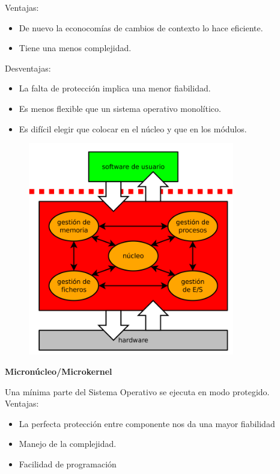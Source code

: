 \documentclass{article}
\begin{document}
Ventajas:
\begin{itemize}
\item De nuevo la econocomías de cambios de contexto lo hace eficiente.

\item Tiene una menos complejidad.
\end{itemize}

Desventajas:
\begin{itemize}
\item La falta de protección implica una menor fiabilidad.

\item Es menos flexible que un sistema operativo monolítico.

\item Es difícil elegir que colocar en el núcleo y que en los módulos.
\end{itemize}

\begin{figure}[h]
\centering
\includegraphics[scale=1, width=90mm]{modular.png}
\end{figure}
\newpage

\textbf{Micronúcleo/Microkernel}

Una mínima parte del Sistema Operativo se ejecuta en modo protegido. \\

Ventajas:
\begin{itemize}
\item La perfecta protección entre componente nos da una mayor fiabilidad

\item Manejo de la complejidad.

\item Facilidad de programación
\end{itemize}
\end{document}
